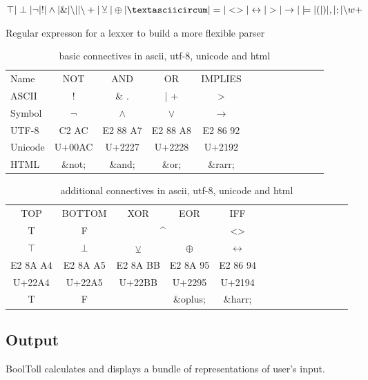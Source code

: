 \begin{table}[htdp]
\begin{center}%

$\top | \perp 
| \neg | !
| \wedge | \&
| {\setminus}| | {\setminus}+
| \veebar | \oplus | \textasciicircum
| = | <> | \leftrightarrow 
| > | \rightarrow | \models
| ( | ) | , | ; 
| {\setminus}w+$ %
\caption{Regular expresson for a lexxer to build a more flexible parser}
\end{center}
\label{tab:REGEX}
\end{table}%

\begin{table}[htdp]
\begin{center}
\begin{tabular}{l|c|c|c|cc|c|c|c|c|c|c|c|}
Name	& NOT		& AND		& OR		&  IMPLIES \\
ASCII 	& ! 			& \& \quad .	& |  \quad +			&> 	\\
Symbol  	& $\neg$		& $\wedge$	& {$\vee$}		&$\rightarrow$ \\ 
UTF-8	& C2 AC		& E2 88 A7	& {E2 88 A8}	&E2 86 92\\
Unicode	& U+00AC 	& U+2227		& {U+2228}	&U+2192\\
HTML	& \&not;		& \&and;		& \&or;		& \&rarr; 
\end{tabular}
\caption{basic connectives in ascii, utf-8, unicode and html}
\end{center}
\label{tab:BASICSYMBOLS}
\end{table}%

\begin{table}[htdp]
\begin{center}
\begin{tabular}{c|c|cc|cccccccccc}
TOP			& BOTTOM	& XOR & EOR		& IFF\\	
T \quad 1	& F  \quad 0	& \multicolumn{2}{c|}{\textasciicircum} 	& <> \\
$\top$		& $\perp$		& $\veebar$ 	&$\oplus$   			&$ \leftrightarrow$\\
E2 8A A4	& E2 8A A5	& E2 8A BB	& E2 8A 95			&E2 86 94\\
U+22A4		& U+22A5		& U+22BB	& U+2295				&U+2194\\
T			& F			&			& \&oplus;				& \&harr;
\end{tabular}
\caption{additional connectives in ascii, utf-8, unicode and html}
\end{center}
\label{tab:ADDITIONALSYMBOLS}
\end{table}%


\subsection{Output}

BoolToll calculates and displays a bundle of representations of user's input. 


